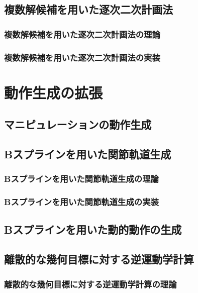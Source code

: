 \documentclass[]{jarticle}
\begin{document}
\subsection{複数解候補を用いた逐次二次計画法} \label{sec:sqp-msc}
\subsubsection{複数解候補を用いた逐次二次計画法の理論}

\subsubsection{複数解候補を用いた逐次二次計画法の実装}


\section{動作生成の拡張} \label{chap:extended}
\subsection{マニピュレーションの動作生成} \label{sec:manip}


\subsection{Bスプラインを用いた関節軌道生成} \label{sec:bspline}
\subsubsection{Bスプラインを用いた関節軌道生成の理論}

\subsubsection{Bスプラインを用いた関節軌道生成の実装}

\subsection{Bスプラインを用いた動的動作の生成} \label{sec:dynamic}

\subsection{離散的な幾何目標に対する逆運動学計算} \label{sec:discrete-ik}
\subsubsection{離散的な幾何目標に対する逆運動学計算の理論}

\end{document}
